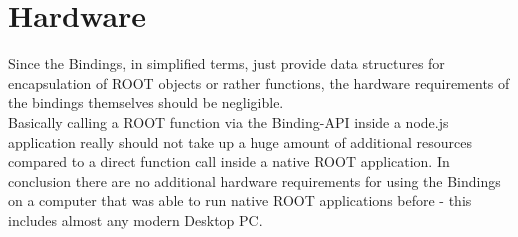 \section{Hardware}
Since the Bindings, in simplified terms, just provide data structures for encapsulation of ROOT objects or rather functions, the hardware requirements of the bindings themselves should be negligible.\\
Basically calling a ROOT function via the Binding-API inside a node.js application really should not take up a huge amount of additional resources compared to a direct function call inside a native ROOT application.
In conclusion there are no additional hardware requirements for using the Bindings on a computer that was able to run native ROOT applications before - this includes almost any modern Desktop PC.
